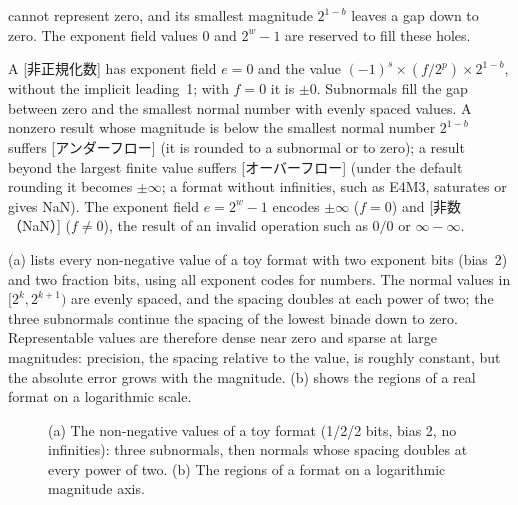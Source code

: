 \documentclass[../main.tex]{subfiles}
\begin{document}
 cannot represent zero, and its smallest magnitude
$2^{1-b}$ leaves a gap down to zero.  The exponent field values $0$ and
$2^w - 1$ are reserved to fill these holes.

\begin{definition}
  A [非正規化数] has exponent field $e = 0$ and
  the value $(-1)^{s} \times (f / 2^{p}) \times 2^{1 - b}$, without the
  implicit leading~1; with $f = 0$ it is $\pm 0$.  Subnormals fill the
  gap between zero and the smallest normal number with evenly spaced
  values.  A nonzero result whose magnitude is below the smallest normal number
  $2^{1-b}$ suffers [アンダーフロー] (it is rounded to a
  subnormal or to zero); a result beyond the largest finite value suffers
  [オーバーフロー] (under the default rounding it becomes
  $\pm\infty$; a format without infinities, such as E4M3, saturates or
  gives NaN).  The exponent
  field $e = 2^w - 1$ encodes $\pm\infty$ ($f = 0$) and
  [非数（NaN）] ($f \ne 0$), the result of an
  invalid operation such as $0/0$ or $\infty - \infty$.
\end{definition}

(a) lists every non-negative value of a toy
format with two exponent bits (bias~2) and two fraction bits, using all
exponent codes for numbers.  The normal values in $[2^{k}, 2^{k+1})$ are
evenly spaced, and the spacing doubles at each power of two; the three
subnormals continue the spacing of the lowest binade down to zero.
Representable values are therefore dense near zero and sparse at large
magnitudes: precision, the spacing relative to the value, is roughly
constant, but the absolute error grows with the magnitude.
(b) shows the regions of a real format on a
logarithmic scale.

\begin{figure}[tb]
  \centering
  
  \caption{(a) The non-negative values of a toy format (1/2/2 bits, bias
    2, no infinities): three subnormals, then normals whose spacing
    doubles at every power of two.  (b) The regions of a format on a
    logarithmic magnitude axis.}
  \label{fig:l12-number-line}
\end{figure}
\end{document}
